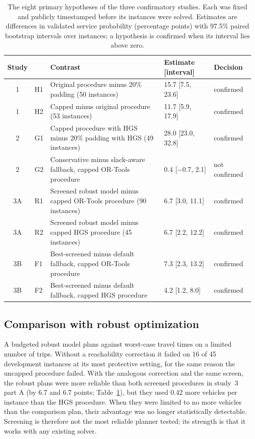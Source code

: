 \documentclass[12pt,letterpaper]{article}
\begin{document}
\begin{table}[t]
\centering
\small
\caption{The eight primary hypotheses of the three confirmatory studies. Each was fixed and publicly timestamped before its instances were solved. Estimates are differences in validated service probability (percentage points) with 97.5\% paired bootstrap intervals over instances; a hypothesis is confirmed when its interval lies above zero.}
\label{tab:primaries}
\begin{tabular}{@{}cllll@{}}
\toprule
Study & & Contrast & Estimate [interval] & Decision\\
\midrule
1 & H1 & Original procedure minus 20\% padding (50 instances) & 15.7 [7.5, 23.6] & confirmed\\
1 & H2 & Capped minus original procedure (53 instances) & 11.7 [5.9, 17.9] & confirmed\\
2 & G1 & Capped procedure with HGS minus 20\% padding with HGS (49 instances) & 28.0 [23.0, 32.8] & confirmed\\
2 & G2 & Conservative minus slack-aware fallback, capped OR-Tools procedure & 0.4 [$-$0.7, 2.1] & not confirmed\\
3A & R1 & Screened robust model minus capped OR-Tools procedure (90 instances) & 6.7 [3.0, 11.1] & confirmed\\
3A & R2 & Screened robust model minus capped HGS procedure (45 instances) & 6.7 [2.2, 12.2] & confirmed\\
3B & F1 & Best-screened minus default fallback, capped OR-Tools procedure & 7.3 [2.3, 13.2] & confirmed\\
3B & F2 & Best-screened minus default fallback, capped HGS procedure & 4.2 [1.2, 8.0] & confirmed\\
\bottomrule
\end{tabular}
\end{table}

\subsection{Comparison with robust optimization}

A budgeted robust model plans against worst-case travel times on a limited number
of trips. Without a reachability correction it failed on 16 of
45 development instances at its most protective setting, for the same
reason the uncapped procedure failed. With the analogous correction and the same
screen, the robust plans were more reliable than both screened procedures in
study~3 part A (by 6.7 and 6.7 points; Table~\ref{tab:primaries}), but
they used 0.42 more vehicles per instance than the HGS procedure. When they
were limited to no more vehicles than the comparison plan, their advantage was no
longer statistically detectable. Screening is therefore not the most reliable
planner tested; its strength is that it works with any existing solver.
\end{document}
